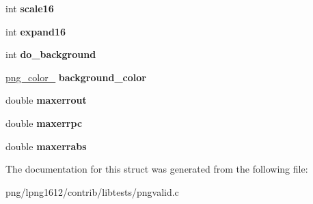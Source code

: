 \begin{DoxyCompactItemize}
\item 
\hypertarget{structgamma__display_a6b52564b39dec1168a2e6763f63c1838}{int {\bfseries scale16}}\label{structgamma__display_a6b52564b39dec1168a2e6763f63c1838}

\item 
\hypertarget{structgamma__display_a11dd9ba92e8b8199cecf485d5ec0bcea}{int {\bfseries expand16}}\label{structgamma__display_a11dd9ba92e8b8199cecf485d5ec0bcea}

\item 
\hypertarget{structgamma__display_a745511a6eb7119caebe828d042c6e359}{int {\bfseries do\+\_\+background}}\label{structgamma__display_a745511a6eb7119caebe828d042c6e359}

\item 
\hypertarget{structgamma__display_af371bebb5671fa98b9dcb619aba6eb07}{\hyperlink{structpng__color__16__struct}{png\+\_\+color\+\_} {\bfseries background\+\_\+color}}\label{structgamma__display_af371bebb5671fa98b9dcb619aba6eb07}

\item 
\hypertarget{structgamma__display_a6c697264719e669a8c59ab424a1728c1}{double {\bfseries maxerrout}}\label{structgamma__display_a6c697264719e669a8c59ab424a1728c1}

\item 
\hypertarget{structgamma__display_ad60b209a7068e7b4d40cbd6bb44e3328}{double {\bfseries maxerrpc}}\label{structgamma__display_ad60b209a7068e7b4d40cbd6bb44e3328}

\item 
\hypertarget{structgamma__display_a8374e54bbe47341a4da74c392ea28c82}{double {\bfseries maxerrabs}}\label{structgamma__display_a8374e54bbe47341a4da74c392ea28c82}

\end{DoxyCompactItemize}


The documentation for this struct was generated from the following file\+:\begin{DoxyCompactItemize}
\item 
png/lpng1612/contrib/libtests/pngvalid.\+c\end{DoxyCompactItemize}
